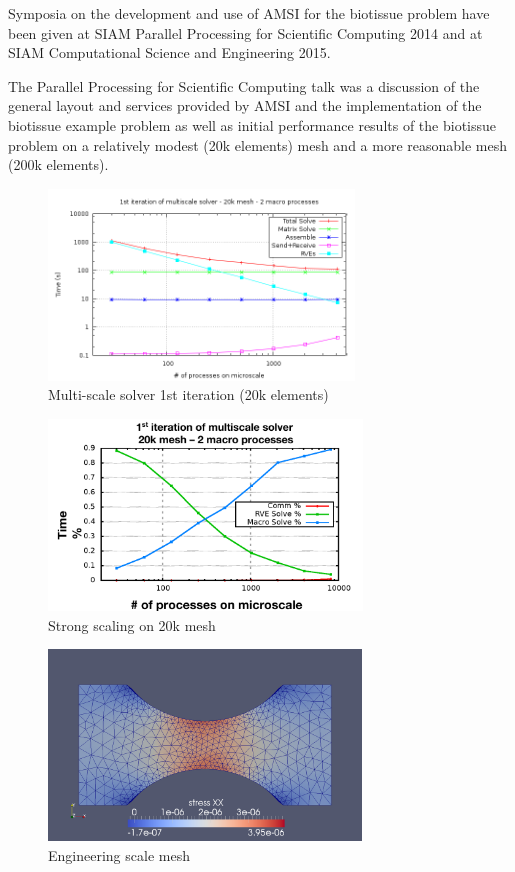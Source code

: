 Symposia on the development and use of AMSI for the biotissue problem have been given at SIAM Parallel Processing for Scientific Computing 2014 and at SIAM Computational Science and Engineering 2015.

The Parallel Processing for Scientific Computing talk \cite{} was a discussion of the general layout and services provided by AMSI and the implementation of the biotissue example problem as well as initial performance results of the biotissue problem on a relatively modest (20k elements) mesh and a more reasonable mesh (200k elements).

\begin{figure}
  \begin{center}
    \includegraphics[height=2in]{allTimes_2macro_20k.png}
  \end{center}
  \caption{\small Multi-scale solver 1st iteration (20k elements)}
  \label{20k_first_iteration}
\end{figure}

\begin{figure}
  \begin{center}
    \includegraphics[height=2in]{siam_pp_weak_scaling.png}
  \end{center}
  \caption{\small Strong scaling on 20k mesh}
  \label{strong_scaling}
\end{figure}

\begin{figure}
  \begin{center}
    \includegraphics[height=2in]{dogBone14k.png}
  \end{center}
  \caption{\small Engineering scale mesh}
  \label{dogbone_mesh}
\end{figure}


